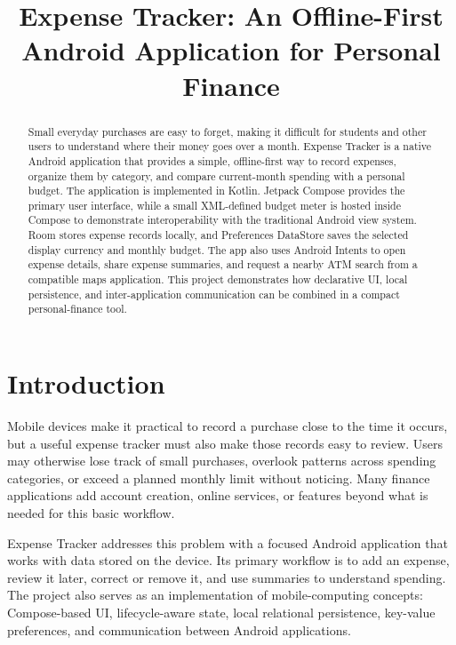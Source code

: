 \documentclass[sigconf,nonacm]{acmart}
\begin{document}
\title{Expense Tracker: An Offline-First Android Application for Personal Finance}

\begin{abstract}
Small everyday purchases are easy to forget, making it difficult for students and other users to understand where their money goes over a month. Expense Tracker is a native Android application that provides a simple, offline-first way to record expenses, organize them by category, and compare current-month spending with a personal budget. The application is implemented in Kotlin. Jetpack Compose provides the primary user interface, while a small XML-defined budget meter is hosted inside Compose to demonstrate interoperability with the traditional Android view system. Room stores expense records locally, and Preferences DataStore saves the selected display currency and monthly budget. The app also uses Android Intents to open expense details, share expense summaries, and request a nearby ATM search from a compatible maps application. This project demonstrates how declarative UI, local persistence, and inter-application communication can be combined in a compact personal-finance tool.
\end{abstract}


\maketitle

\section{Introduction}
Mobile devices make it practical to record a purchase close to the time it occurs, but a useful expense tracker must also make those records easy to review. Users may otherwise lose track of small purchases, overlook patterns across spending categories, or exceed a planned monthly limit without noticing. Many finance applications add account creation, online services, or features beyond what is needed for this basic workflow.

Expense Tracker addresses this problem with a focused Android application that works with data stored on the device. Its primary workflow is to add an expense, review it later, correct or remove it, and use summaries to understand spending. The project also serves as an implementation of mobile-computing concepts: Compose-based UI, lifecycle-aware state, local relational persistence, key-value preferences, and communication between Android applications.
\end{document}
